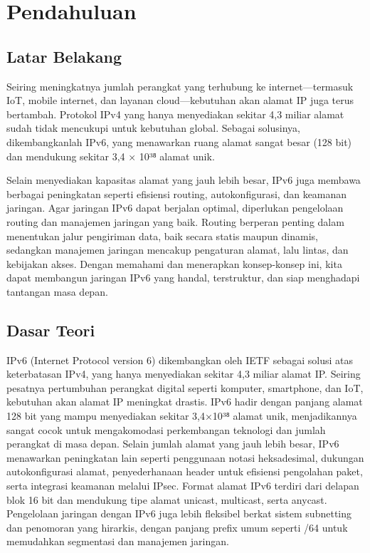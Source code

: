 \section{Pendahuluan}
\subsection{Latar Belakang}
Seiring meningkatnya jumlah perangkat yang terhubung ke internet—termasuk IoT, mobile internet, dan layanan cloud—kebutuhan akan alamat IP juga terus bertambah. Protokol IPv4 yang hanya menyediakan sekitar 4,3 miliar alamat sudah tidak mencukupi untuk kebutuhan global. Sebagai solusinya, dikembangkanlah IPv6, yang menawarkan ruang alamat sangat besar (128 bit) dan mendukung sekitar 3,4 × 10³⁸ alamat unik.

Selain menyediakan kapasitas alamat yang jauh lebih besar, IPv6 juga membawa berbagai peningkatan seperti efisiensi routing, autokonfigurasi, dan keamanan jaringan. Agar jaringan IPv6 dapat berjalan optimal, diperlukan pengelolaan routing dan manajemen jaringan yang baik. Routing berperan penting dalam menentukan jalur pengiriman data, baik secara statis maupun dinamis, sedangkan manajemen jaringan mencakup pengaturan alamat, lalu lintas, dan kebijakan akses. Dengan memahami dan menerapkan konsep-konsep ini, kita dapat membangun jaringan IPv6 yang handal, terstruktur, dan siap menghadapi tantangan masa depan.

\subsection{Dasar Teori}
IPv6 (Internet Protocol version 6) dikembangkan oleh IETF sebagai solusi atas keterbatasan IPv4, yang hanya menyediakan sekitar 4,3 miliar alamat IP. Seiring pesatnya pertumbuhan perangkat digital seperti komputer, smartphone, dan IoT, kebutuhan akan alamat IP meningkat drastis. IPv6 hadir dengan panjang alamat 128 bit yang mampu menyediakan sekitar 3,4×10³⁸ alamat unik, menjadikannya sangat cocok untuk mengakomodasi perkembangan teknologi dan jumlah perangkat di masa depan. Selain jumlah alamat yang jauh lebih besar, IPv6 menawarkan peningkatan lain seperti penggunaan notasi heksadesimal, dukungan autokonfigurasi alamat, penyederhanaan header untuk efisiensi pengolahan paket, serta integrasi keamanan melalui IPsec. Format alamat IPv6 terdiri dari delapan blok 16 bit dan mendukung tipe alamat unicast, multicast, serta anycast. Pengelolaan jaringan dengan IPv6 juga lebih fleksibel berkat sistem subnetting dan penomoran yang hirarkis, dengan panjang prefix umum seperti /64 untuk memudahkan segmentasi dan manajemen jaringan.


